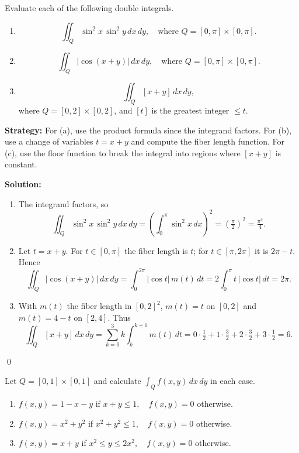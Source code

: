\begin{problembox}
Evaluate each of the following double integrals.
\begin{enumerate}[label=(\alph*)]
    \item \[ \iint_{Q} \sin^2 x \, \sin^2 y \, dx \, dy, \quad \text{where } Q = [0, \pi] \times [0, \pi]. \]
    \item \[ \iint_{Q} |\cos (x + y)| \, dx \, dy, \quad \text{where } Q = [0, \pi] \times [0, \pi]. \]
    \item $$ \iint_{Q} [x + y] \, dx \, dy,$$  where $Q = [0, 2] \times [0, 2]$, and $[t]$  is the greatest integer  $\leq t$.
\end{enumerate}
\end{problembox}

\noindent\textbf{Strategy:} For (a), use the product formula since the integrand factors. For (b), use a change of variables $t=x+y$ and compute the fiber length function. For (c), use the floor function to break the integral into regions where $[x+y]$ is constant.

\bigskip\noindent\textbf{Solution:}
\begin{enumerate}[label=(\alph*)]
    \item The integrand factors, so
    \[ \iint_Q \sin^2 x\,\sin^2 y\,dx\,dy = \left(\int_0^{\pi} \sin^2 x\,dx\right)^2 = \left(\tfrac{\pi}{2}\right)^2 = \tfrac{\pi^2}{4}. \]
    \item Let $t=x+y$. For $t\in[0,\pi]$ the fiber length is $t$; for $t\in[\pi,2\pi]$ it is $2\pi-t$. Hence
    \[ \iint_Q |\cos(x+y)|\,dx\,dy = \int_0^{2\pi} |\cos t|\,m(t)\,dt = 2\int_0^{\pi} t\,|\cos t|\,dt = 2\pi. \]
    \item With $m(t)$ the fiber length in $[0,2]^2$, $m(t)=t$ on $[0,2]$ and $m(t)=4-t$ on $[2,4]$. Thus
    \[ \iint_Q [x+y]\,dx\,dy = \sum_{k=0}^3 k\int_k^{k+1} m(t)\,dt = 0\cdot\tfrac{1}{2} + 1\cdot\tfrac{3}{2} + 2\cdot\tfrac{3}{2} + 3\cdot\tfrac{1}{2} = 6. \]
\end{enumerate}\qed


\begin{problembox}
Let \( Q = [0, 1] \times [0, 1] \) and calculate \( \int_{Q} f(x, y) \, dx \, dy \) in each case.
\begin{enumerate}[label=(\alph*)]
    \item \( f(x, y) = 1 - x - y \) if \( x + y \leq 1, \quad f(x, y) = 0 \) otherwise.
    \item \( f(x, y) = x^2 + y^2 \) if \( x^2 + y^2 \leq 1, \quad f(x, y) = 0 \) otherwise.
    \item \( f(x, y) = x + y \) if \( x^2 \leq y \leq 2x^2, \quad f(x, y) = 0 \) otherwise.
\end{enumerate}
\end{problembox}

